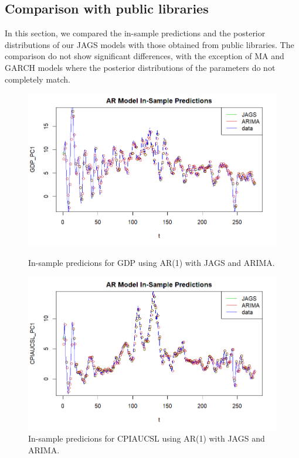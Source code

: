 \subsection*{Comparison with public libraries}
In this section, we compared the in-sample predictions and the posterior distributions of our JAGS models with those obtained from public libraries. The comparison do not show significant differences, with the exception of MA and GARCH models where the posterior distributions of the parameters do not completely  match.
\begin{figure}[H]
    \centering
    \begin{minipage}{0.49\textwidth}
        \centering
        \includegraphics[width=\textwidth]{images/2-AR/ARIMA_predictions_gdp.png}
        \caption{In-sample predicions for GDP using AR(1) with JAGS and ARIMA.}
        \label{fig:ARIMA_AR_gdp_prediction}
    \end{minipage}\hfill
    \begin{minipage}{0.49\textwidth}
        \centering
        \includegraphics[width=\textwidth]{images/2-AR/ARIMA_predictions_infl.png}
        \caption{In-sample predicions for CPIAUCSL using AR(1) with JAGS and ARIMA.}
        \label{fig:ARIMA_AR_infl_prediction}
    \end{minipage}
\end{figure}
